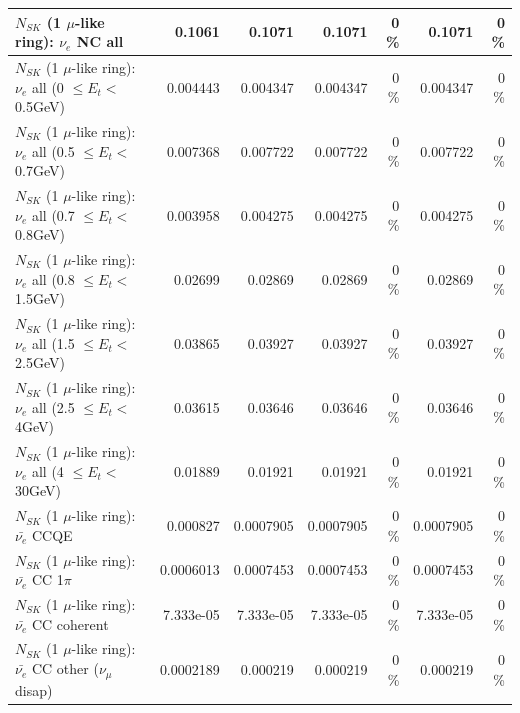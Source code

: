 \begin{table}
\begin{tabular}{| l | r | r | r  r | r  r |}
                                  $N_{SK}$ (1 $\mu$-like ring): $\nu_{e}$ NC all &          0.1061 &          0.1071 &          0.1071 &        0 \%  &          0.1071 &        0 \%  \\ 
\hline
           $N_{SK}$ (1 $\mu$-like ring): $\nu_{e}$ all (0 $\leq E_{t} <$ 0.5GeV) &        0.004443 &        0.004347 &        0.004347 &        0 \%  &        0.004347 &        0 \%  \\ 
         $N_{SK}$ (1 $\mu$-like ring): $\nu_{e}$ all (0.5 $\leq E_{t} <$ 0.7GeV) &        0.007368 &        0.007722 &        0.007722 &        0 \%  &        0.007722 &        0 \%  \\ 
         $N_{SK}$ (1 $\mu$-like ring): $\nu_{e}$ all (0.7 $\leq E_{t} <$ 0.8GeV) &        0.003958 &        0.004275 &        0.004275 &        0 \%  &        0.004275 &        0 \%  \\ 
         $N_{SK}$ (1 $\mu$-like ring): $\nu_{e}$ all (0.8 $\leq E_{t} <$ 1.5GeV) &         0.02699 &         0.02869 &         0.02869 &        0 \%  &         0.02869 &        0 \%  \\ 
         $N_{SK}$ (1 $\mu$-like ring): $\nu_{e}$ all (1.5 $\leq E_{t} <$ 2.5GeV) &         0.03865 &         0.03927 &         0.03927 &        0 \%  &         0.03927 &        0 \%  \\ 
           $N_{SK}$ (1 $\mu$-like ring): $\nu_{e}$ all (2.5 $\leq E_{t} <$ 4GeV) &         0.03615 &         0.03646 &         0.03646 &        0 \%  &         0.03646 &        0 \%  \\ 
            $N_{SK}$ (1 $\mu$-like ring): $\nu_{e}$ all (4 $\leq E_{t} <$ 30GeV) &         0.01889 &         0.01921 &         0.01921 &        0 \%  &         0.01921 &        0 \%  \\ 
\hline
\hline
\hline
                                $N_{SK}$ (1 $\mu$-like ring): $\bar{\nu_e}$ CCQE &        0.000827 &       0.0007905 &       0.0007905 &        0 \%  &       0.0007905 &        0 \%  \\ 
                           $N_{SK}$ (1 $\mu$-like ring): $\bar{\nu_e}$ CC 1$\pi$ &       0.0006013 &       0.0007453 &       0.0007453 &        0 \%  &       0.0007453 &        0 \%  \\ 
                         $N_{SK}$ (1 $\mu$-like ring): $\bar{\nu_e}$ CC coherent &       7.333e-05 &       7.333e-05 &       7.333e-05 &        0 \%  &       7.333e-05 &        0 \%  \\ 
          $N_{SK}$ (1 $\mu$-like ring): $\bar{\nu_e}$ CC other ($\nu_\mu$ disap) &       0.0002189 &        0.000219 &        0.000219 &        0 \%  &        0.000219 &        0 \%  \\ 

\end{tabular}
\end{table}

